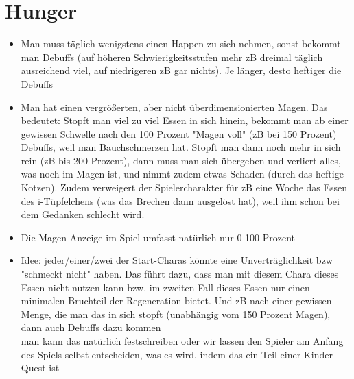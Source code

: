 \section{Hunger}
\begin{itemize}
	\item Man muss täglich wenigstens einen Happen zu sich nehmen, sonst bekommt man Debuffs (auf höheren Schwierigkeitsstufen mehr zB dreimal täglich ausreichend viel, auf niedrigeren zB gar nichts). Je länger, desto heftiger die Debuffs
	\item Man hat einen vergrößerten, aber nicht überdimensionierten Magen. Das bedeutet: Stopft man viel zu viel Essen in sich hinein, bekommt man ab einer gewissen Schwelle nach den 100 Prozent "Magen voll" (zB bei 150 Prozent) Debuffs, weil man Bauchschmerzen hat. Stopft man dann noch mehr in sich rein (zB bis 200 Prozent), dann muss man sich übergeben und verliert alles, was noch im Magen ist, und nimmt zudem etwas Schaden (durch das heftige Kotzen). Zudem verweigert der Spielercharakter für zB eine Woche das Essen des i-Tüpfelchens (was das Brechen dann ausgelöst hat), weil ihm schon bei dem Gedanken schlecht wird. 
	\item Die Magen-Anzeige im Spiel umfasst natürlich nur 0-100 Prozent
	\item Idee: jeder/einer/zwei der Start-Charas könnte eine Unverträglichkeit bzw "schmeckt nicht" haben. Das führt dazu, dass man mit diesem Chara dieses Essen nicht nutzen kann bzw. im zweiten Fall dieses Essen nur einen minimalen Bruchteil der Regeneration bietet. Und zB nach einer gewissen Menge, die man das in sich stopft (unabhängig vom 150 Prozent Magen), dann auch Debuffs dazu kommen\\
	man kann das natürlich festschreiben oder wir lassen den Spieler am Anfang des Spiels selbst entscheiden, was es wird, indem das ein Teil einer Kinder-Quest ist
\end{itemize}
